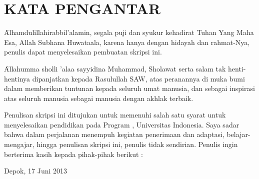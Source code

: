 \chapter*{KATA PENGANTAR}
\f{Alhamdulillahirabbil'alamin}, segala puji dan syukur kehadirat Tuhan Yang Maha Esa, Allah Subhana Huwataala, karena hanya dengan hidayah dan rahmat-Nya, penulis dapat menyelesaikan pembuatan skripsi ini.

\f{Allahumma sholli 'alaa sayyidina Muhammad}, Sholawat serta salam tak henti-hentinya dipanjatkan kepada Rasulullah SAW, atas peranannya di muka bumi dalam memberikan tuntunan kepada seluruh umat manusia, dan sebagai inspirasi atas seluruh manusia sebagai manusia dengan akhlak terbaik.

Penulisan skripsi ini ditujukan untuk memenuhi salah satu syarat untuk menyelesaikan pendidikan pada Program \gelar, Universitas Indonesia. Saya sadar bahwa dalam perjalanan menempuh kegiatan penerimaan dan adaptasi, belajar-mengajar, hingga penulisan skripsi ini, penulis tidak sendirian. Penulis ingin berterima kasih kepada pihak-pihak berikut : 

\vspace*{0.1cm}
\begin{flushright}
Depok, 17 Juni 2013\\[0.1cm]
\vspace*{1cm}
\penulis

\end{flushright}